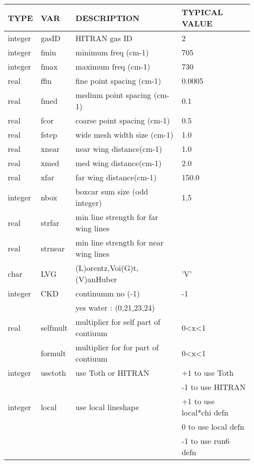 \documentclass[11pt]{article}
\begin{document}
\begin{longtable}{llll}
  TYPE  &   VAR  &         DESCRIPTION  &            TYPICAL VALUE\\
\hline
integer & gasID  &       HITRAN gas ID      &            2\\
\hline

integer & fmin    &      minimum freq (cm-1) &          705\\
integer & fmax    &      maximum freq (cm-1) &          730\\
\hline

real   &  ffin    &      fine point spacing (cm-1) &    0.0005\\
real   &  fmed    &      medium point spacing (cm-1)&   0.1\\
real   &  fcor    &      coarse point spacing (cm-1)  & 0.5\\
\hline

real   &  fstep   &      wide mesh width size (cm-1) &    1.0\\
real   &  xnear   &      near wing distance(cm-1)    &    1.0\\
real   &  xmed    &      med wing distance(cm-1)     &    2.0\\
real   &  xfar    &      far wing distance(cm-1)     &    150.0\\
\hline

integer & nbox     &     boxcar sum size (odd integer) &  1,5\\
\hline

real   &  strfar   &    min line strength for far wing lines & \\
real   &  strnear  &    min line strength for near wing lines& \\
\hline

char   &  LVG      &      (L)orentz,Voi(G)t,(V)anHuber  &  'V' \\
integer &  CKD     &       continumm no (-1)            &   -1 \\
        &          &       yes water : (0,21,23,24)    & \\
\hline

real    &  selfmult &       multiplier for self part of contiuum &  0<x<1 \\
        &  formult  &       multiplier for for  part of contiuum  & 0<x<1 \\
\hline

integer & usetoth &        use Toth or HITRAN &           +1 to use Toth \\
        &         &                           &          -1 to use HITRAN \\
\hline

integer & local &         use local lineshape   & +1 to use local*chi defn\\
        &       &                                  &  0 to use local defn \\
        &       &                                  & -1 to use run6 defn\\
\hline
\end{longtable}
\end{document}

